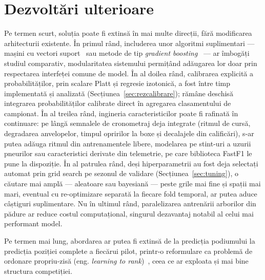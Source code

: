 \documentclass[12pt,a4paper]{report}
\begin{document}
\section{Dezvoltări ulterioare}
\label{sec:dezvoltari}

Pe termen scurt, soluția poate fi extinsă în mai multe direcții, fără modificarea arhitecturii
existente. În primul rând, includerea unor algoritmi suplimentari --- mașini cu vectori
suport~\cite{cortes1995support} sau metode de tip \emph{gradient boosting}~\cite{friedman2001greedy,
chen2016xgboost} --- ar îmbogăți studiul comparativ, modularitatea sistemului permițând adăugarea
lor doar prin respectarea interfeței comune de model. În al doilea rând, calibrarea explicită a
probabilităților, prin scalare Platt și regresie izotonică, a fost între timp implementată și
analizată (Secțiunea~\ref{sec:rezcalibrare}); rămâne deschisă integrarea probabilităților calibrate
direct în agregarea clasamentului de campionat. În al treilea rând, ingineria caracteristicilor poate
fi rafinată în continuare: pe lângă semnalele de
cronometraj deja integrate (ritmul de cursă, degradarea anvelopelor, timpul opririlor la boxe și
decalajele din calificări), s-ar putea adăuga ritmul din antrenamentele libere, modelarea pe
stint-uri a uzurii pneurilor sau caracteristici derivate din telemetrie, pe care biblioteca FastF1
le pune la dispoziție. În al patrulea rând, deși hiperparametrii au fost deja selectați automat prin
grid search pe sezonul de validare (Secțiunea~\ref{sec:tuning}), o căutare mai amplă --- aleatoare
sau bayesiană --- peste grile mai fine și spații mai mari, eventual cu re-optimizare separată la
fiecare fold temporal, ar putea aduce câștiguri suplimentare. Nu în ultimul rând, paralelizarea
antrenării arborilor din pădure ar reduce costul computațional, singurul dezavantaj notabil al
celui mai performant model.

Pe termen mai lung, abordarea ar putea fi extinsă de la predicția podiumului la predicția poziției
complete a fiecărui pilot, printr-o reformulare ca problemă de ordonare propriu-zisă (eng.
\emph{learning to rank})~\cite{liu2009learning}, ceea ce ar exploata și mai bine structura
competiției.

\printbibliography[heading=bibintoc, title={Bibliografie}]
\end{document}

